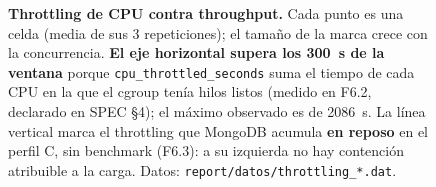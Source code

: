 \begin{figure}[htbp]
  \caption[Throttling contra throughput]{%
    \textbf{Throttling de CPU contra throughput.} Cada punto es una celda (media de
    sus 3 repeticiones); el tamaño de la marca crece con la concurrencia.
    \textbf{El eje horizontal supera los 300~s de la ventana} porque
    \texttt{cpu\_throttled\_seconds} suma el tiempo de cada CPU en la que el cgroup
    tenía hilos listos (medido en F6.2, declarado en SPEC §4); el máximo observado
    es de \num{2086}~s. La línea vertical marca el throttling que MongoDB acumula
    \textbf{en reposo} en el perfil C, sin benchmark (F6.3): a su izquierda no hay
    contención atribuible a la carga. Datos:
    \texttt{report/datos/throttling\_*.dat}.}
  \label{fig:throttling-qps}
\end{figure}
